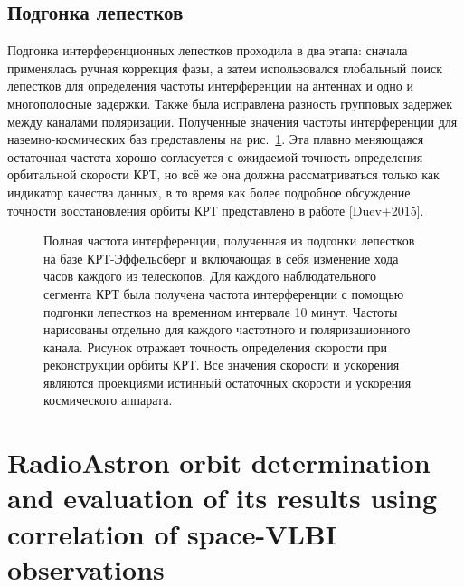 \subsection{Подгонка лепестков}

Подгонка интерференционных лепестков проходила в два этапа: сначала применялась ручная коррекция
фазы, а затем использовался глобальный поиск лепестков для определения частоты интерференции на
антеннах и одно и многополосные задержки. Также была исправлена разность групповых задержек между
каналами поляризации. Полученные значения частоты интерференции для наземно-космических баз
представлены на рис.~\ref{fig:0642_rate}. Эта плавно меняющаяся остаточная частота
хорошо согласуется с ожидаемой точность определения орбитальной скорости КРТ, но всё же она должна
рассматриваться только как индикатор качества данных, в то время как более подробное обсуждение
точности восстановления орбиты КРТ представлено в работе [Duev+2015].

\begin{figure}[]
 \caption{Полная частота интерференции, полученная из подгонки лепестков на базе КРТ-Эффельсберг и
включающая в себя изменение хода часов каждого из телескопов. Для каждого наблюдательного сегмента
КРТ была получена частота интерференции с помощью подгонки лепестков на временном интервале 10
минут. Частоты нарисованы отдельно для каждого частотного и поляризационного канала. Рисунок
отражает точность определения скорости при реконструкции орбиты КРТ. Все значения скорости и
ускорения являются проекциями истинный остаточных скорости и ускорения космического аппарата.}
 \label{fig:0642_rate}
\end{figure}


\section{RadioAstron orbit determination and evaluation of its results using correlation of
space-VLBI observations}



